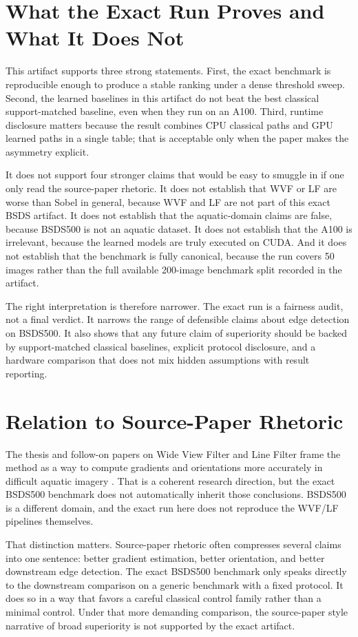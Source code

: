 \documentclass[conference]{IEEEtran}
\begin{document}
\section{What the Exact Run Proves and What It Does Not}
This artifact supports three strong statements. First, the exact benchmark is reproducible enough to produce a stable ranking under a dense threshold sweep. Second, the learned baselines in this artifact do not beat the best classical support-matched baseline, even when they run on an A100. Third, runtime disclosure matters because the result combines CPU classical paths and GPU learned paths in a single table; that is acceptable only when the paper makes the asymmetry explicit.

It does not support four stronger claims that would be easy to smuggle in if one only read the source-paper rhetoric. It does not establish that WVF or LF are worse than Sobel in general, because WVF and LF are not part of this exact BSDS artifact. It does not establish that the aquatic-domain claims are false, because BSDS500 is not an aquatic dataset. It does not establish that the A100 is irrelevant, because the learned models are truly executed on CUDA. And it does not establish that the benchmark is fully canonical, because the run covers 50 images rather than the full available 200-image benchmark split recorded in the artifact.

The right interpretation is therefore narrower. The exact run is a fairness audit, not a final verdict. It narrows the range of defensible claims about edge detection on BSDS500. It also shows that any future claim of superiority should be backed by support-matched classical baselines, explicit protocol disclosure, and a hardware comparison that does not mix hidden assumptions with result reporting.

\section{Relation to Source-Paper Rhetoric}
The thesis and follow-on papers on Wide View Filter and Line Filter frame the method as a way to compute gradients and orientations more accurately in difficult aquatic imagery \cite{bagan2023thesis,bagan2024oceans,bagan2025oceans}. That is a coherent research direction, but the exact BSDS500 benchmark does not automatically inherit those conclusions. BSDS500 is a different domain, and the exact run here does not reproduce the WVF/LF pipelines themselves.

That distinction matters. Source-paper rhetoric often compresses several claims into one sentence: better gradient estimation, better orientation, and better downstream edge detection. The exact BSDS500 benchmark only speaks directly to the downstream comparison on a generic benchmark with a fixed protocol. It does so in a way that favors a careful classical control family rather than a minimal control. Under that more demanding comparison, the source-paper style narrative of broad superiority is not supported by the exact artifact.
\end{document}
